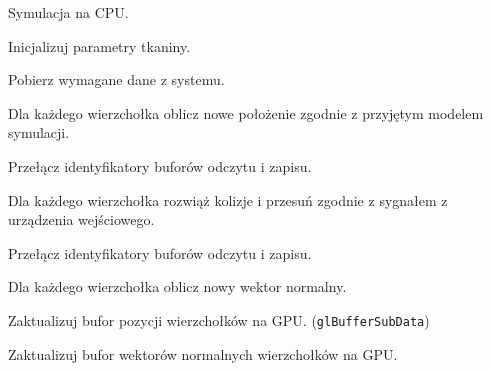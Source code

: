 		\begin{algorithm}
			\label{alg_5_2}
			\caption{Symulacja na CPU.}	
			
			Inicjalizuj parametry tkaniny.
			
			{
				Pobierz wymagane dane z systemu.
				
				Dla każdego wierzchołka oblicz nowe położenie zgodnie z przyjętym modelem symulacji.
				
				Przełącz identyfikatory buforów odczytu i zapisu.
				
				Dla każdego wierzchołka rozwiąż kolizje i przesuń zgodnie z sygnałem z urządzenia wejściowego.
				
				Przełącz identyfikatory buforów odczytu i zapisu.
				
				Dla każdego wierzchołka oblicz nowy wektor normalny.
				
				Zaktualizuj bufor pozycji wierzchołków na GPU. (\texttt{glBufferSubData})
				
				Zaktualizuj bufor wektorów normalnych wierzchołków na GPU.
			}
			
		\end{algorithm}
		
